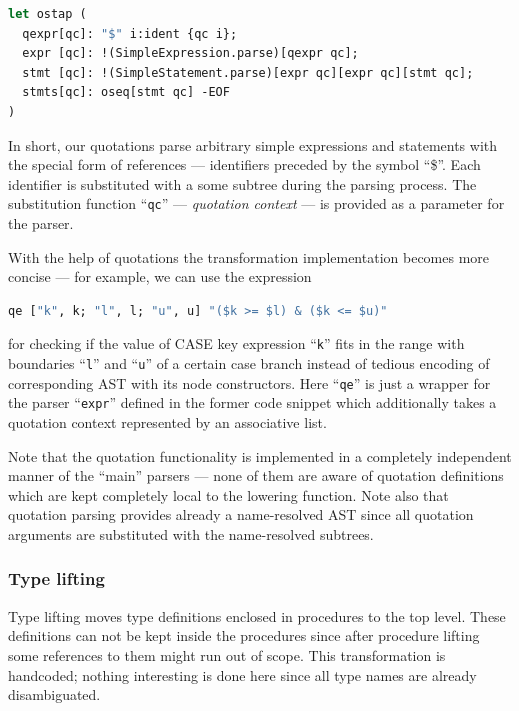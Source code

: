 \begin{lstlisting}[language=ocaml]
let ostap (
  qexpr[qc]: "$" i:ident {qc i};
  expr [qc]: !(SimpleExpression.parse)[qexpr qc];
  stmt [qc]: !(SimpleStatement.parse)[expr qc][expr qc][stmt qc];
  stmts[qc]: oseq[stmt qc] -EOF
)
\end{lstlisting}

In short, our quotations parse arbitrary simple expressions and statements with the special form of
references --- identifiers preceded by the symbol ``\$''. Each identifier is substituted with a
some subtree during the parsing process. The substitution function ``\lstinline{qc}'' --- 
\emph{quotation context} --- is provided as a parameter for the parser. 

With the help of quotations the transformation implementation becomes more concise --- for example, 
we can use the expression

\begin{lstlisting}[language=ocaml]
   qe ["k", k; "l", l; "u", u] "($k >= $l) & ($k <= $u)"
\end{lstlisting}

for checking if the value of CASE key expression ``\lstinline{k}'' fits in the range with boundaries
``\lstinline{l}'' and ``\lstinline{u}'' of a certain case branch instead of tedious encoding of corresponding 
AST with its node constructors. Here ``\lstinline{qe}'' is just a wrapper for the parser ``\lstinline{expr}''
defined in the former code snippet which additionally takes a quotation context represented by an associative 
list.

Note that the quotation functionality is implemented in a completely independent manner of the ``main'' parsers ---
none of them are aware of quotation definitions which are kept completely local to the lowering function. Note also
that quotation parsing provides already a name-resolved AST since all quotation arguments are substituted with 
the name-resolved subtrees.

\subsubsection{Type lifting}

Type lifting moves type definitions enclosed in procedures to the top level. These definitions can not be
kept inside the procedures since after procedure lifting some references to them might run out
of scope. This transformation is handcoded; nothing interesting is done here since all type names are 
already disambiguated.


